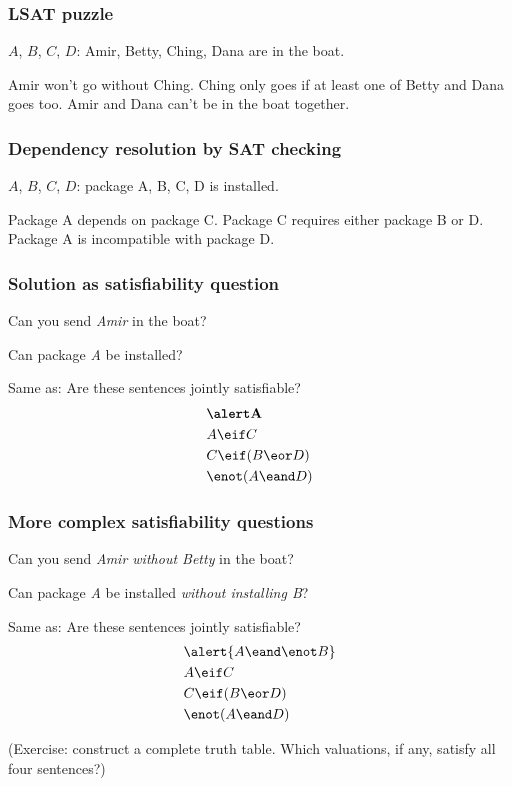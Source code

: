 \begin{frame}
\frametitle{LSAT puzzle}

$A$, $B$, $C$, $D$: Amir, Betty, Ching, Dana are in the boat.

Amir won't go without Ching.
%
Ching only goes if at least one of Betty and Dana goes too.
%
Amir and Dana can't be in the boat together.
\end{frame}

\begin{frame}
\frametitle{Dependency resolution by SAT checking}

$A$, $B$, $C$, $D$: package A, B, C, D is installed.

Package A depends on package C.
%
Package C requires either package B or D.
%
Package A is incompatible with package D.
\end{frame}

\begin{frame}
\frametitle{Solution as satisfiability question}

Can you send \emph{Amir} in the boat?

Can package \emph{A} be installed?

Same as: Are these sentences jointly satisfiable?
\begin{align*}
& \emph{A}\\
& A \eif C\\
& C \eif (B \eor D) \\
& \enot (A \eand D)
\end{align*}
\end{frame}

\begin{frame}
  \frametitle{More complex satisfiability questions}
  
  Can you send \emph{Amir without Betty} in the boat?
  
  Can package \emph{A} be installed \emph{without installing B}?
  
  Same as: Are these sentences jointly satisfiable?
  \begin{align*}
  & \alert{A \eand \enot B}\\
  & A \eif C\\
  & C \eif (B \eor D) \\
  & \enot (A \eand D)
  \end{align*}
  
  (Exercise: construct a complete truth table. Which valuations, if any,
  satisfy all four sentences?)
  \end{frame}
  
